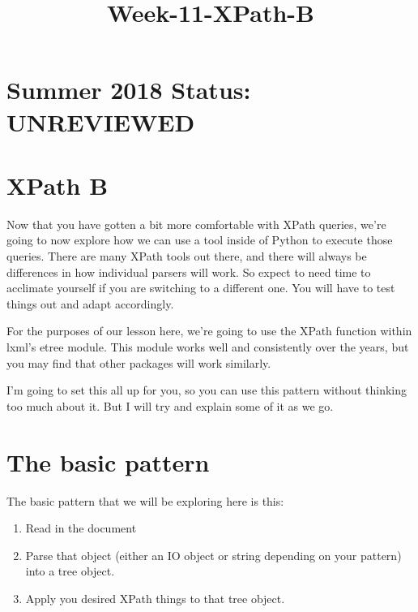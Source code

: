 \documentclass[11pt]{article}
\title{Week-11-XPath-B}
\providecommand{\tightlist}{%
      \setlength{\itemsep}{0pt}\setlength{\parskip}{0pt}}
\begin{document}
    
    
    \maketitle
    
    

    
    \section{Summer 2018 Status:
UNREVIEWED}\label{summer-2018-status-unreviewed}

\section{XPath B}\label{xpath-b}

Now that you have gotten a bit more comfortable with XPath queries,
we're going to now explore how we can use a tool inside of Python to
execute those queries. There are many XPath tools out there, and there
will always be differences in how individual parsers will work. So
expect to need time to acclimate yourself if you are switching to a
different one. You will have to test things out and adapt accordingly.

For the purposes of our lesson here, we're going to use the XPath
function within lxml's etree module. This module works well and
consistently over the years, but you may find that other packages will
work similarly.

I'm going to set this all up for you, so you can use this pattern
without thinking too much about it. But I will try and explain some of
it as we go.

    \section{The basic pattern}\label{the-basic-pattern}

The basic pattern that we will be exploring here is this:

\begin{enumerate}
\def\labelenumi{\arabic{enumi}.}
\tightlist
\item
  Read in the document
\item
  Parse that object (either an IO object or string depending on your
  pattern) into a tree object.
\item
  Apply you desired XPath things to that tree object.
\end{enumerate}
\end{document}
